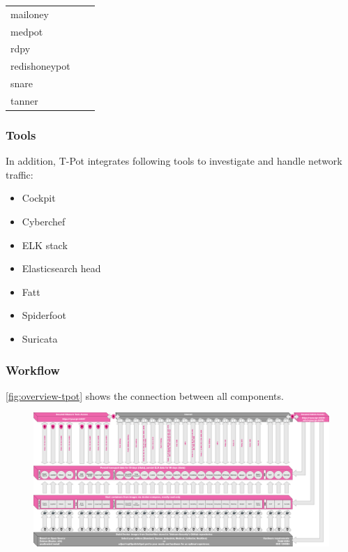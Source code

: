\begin{table}[ht]
\begin{tabularx}{\linewidth}{l|l|l}
        mailoney                                 &                      &               \\
        medpot \cite{medpot2021}                 &                      &               \\
        rdpy \cite{rdpy2021}                     &                      &               \\
        redishoneypot                            &                      &               \\
        snare \cite{snare2021}                   &                      &               \\
        tanner \cite{tanner2021}                 &                      &               \\
        \bottomrule
    \end{tabularx}
    \label{tab:overview-honeypots}
\end{table}

\subsubsection{Tools}

In addition, T-Pot integrates following tools to investigate and handle network traffic:

\begin{itemize}
    \item Cockpit
    \item Cyberchef
    \item ELK stack
    \item Elasticsearch head
    \item Fatt
    \item Spiderfoot
    \item Suricata
\end{itemize}

\subsubsection{Workflow}

\autoref{fig:overview-tpot} shows the connection between all components.

\begin{figure}
    \centering
    \includegraphics[width=\textwidth]{figures/architecture.png}
    \caption{}
    \label{fig:overview-tpot}
\end{figure}

